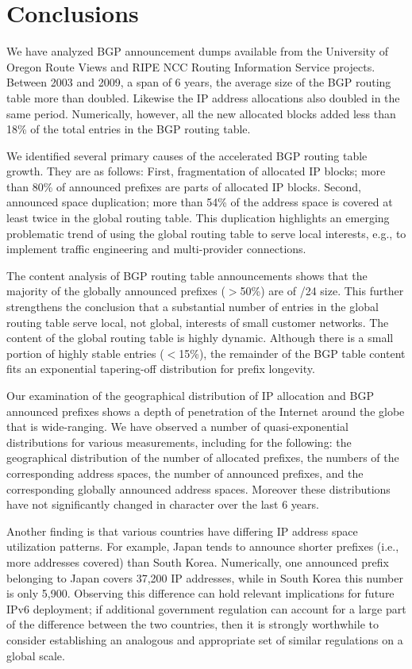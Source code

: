 \section{Conclusions}
\label{sec:conclusions}

We have analyzed BGP announcement dumps available from the University of Oregon
Route Views and RIPE NCC Routing Information Service projects. Between 2003 and
2009, a span of 6 years, the average size of the BGP routing table more than
doubled. Likewise the IP address allocations also doubled in the same period.
Numerically, however, all the new allocated blocks added less than 18\% of the
total entries in the BGP routing table.

We identified several primary causes of the accelerated BGP routing table
growth.  They are as follows: First, fragmentation of allocated IP blocks; more
than 80\% of announced prefixes are parts of allocated IP blocks. Second,
announced space duplication; more than 54\% of the address space is covered at
least twice in the global routing table. This duplication highlights an
emerging problematic trend of using the global routing table to serve local
interests, e.g., to implement traffic engineering and multi-provider
connections.

The content analysis of BGP routing table announcements shows that the majority
of the globally announced prefixes ($>$50\%) are of /24 size. This further
strengthens the conclusion that a substantial number of entries in the global
routing table serve local, not global, interests of small customer networks.
The content of the global routing table is highly dynamic. Although there is a
small portion of highly stable entries ($<$15\%), the remainder of the BGP
table content fits an exponential tapering-off distribution for prefix
longevity.

Our examination of the geographical distribution of IP allocation and BGP
announced prefixes shows a depth of penetration of the Internet around the
globe that is wide-ranging. We have observed a number of quasi-exponential
distributions for various measurements, including for the following: the
geographical distribution of the number of allocated prefixes, the numbers of
the corresponding address spaces, the number of announced prefixes, and the
corresponding globally announced address spaces. Moreover these distributions
have not significantly changed in character over the last 6 years.

Another finding is that various countries have differing IP address space
utilization patterns. For example, Japan tends to announce shorter prefixes
(i.e., more addresses covered) than South Korea. Numerically, one announced
prefix belonging to Japan covers 37,200 IP addresses, while in South Korea this
number is only 5,900. Observing this difference can hold relevant implications
for future IPv6 deployment; if additional government regulation can account for
a large part of the difference between the two countries, then it is strongly
worthwhile to consider establishing an analogous and appropriate set of similar
regulations on a global scale.
